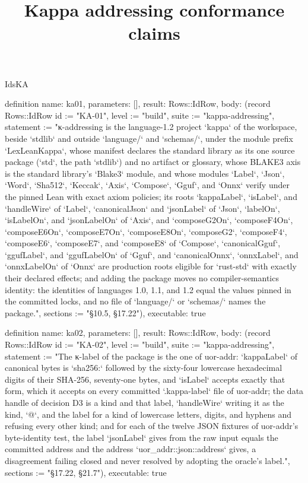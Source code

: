 \begin{lexlean}{IdsKA}
\title{Kappa addressing conformance claims}
\begin{semanticmodule}
definition{
  name: ka01,
  parameters: [],
  result: Rows::IdRow,
  body: (record Rows::IdRow {id := "KA-01", level := "build", suite := "kappa-addressing", statement := "κ-addressing is the language-1.2 project `kappa` of the workspace, beside `stdlib` and outside `language/` and `schemas/`, under the module prefix `LexLeanKappa`, whose manifest declares the standard library as its one source package (`std`, the path `stdlib`) and no artifact or glossary, whose BLAKE3 axis is the standard library's `Blake3` module, and whose modules `Label`, `Json`, `Word`, `Sha512`, `Keccak`, `Axis`, `Compose`, `Gguf`, and `Onnx` verify under the pinned Lean with exact axiom policies; its roots `kappaLabel`, `isLabel`, and `handleWire` of `Label`, `canonicalJson` and `jsonLabel` of `Json`, `labelOn`, `isLabelOn`, and `jsonLabelOn` of `Axis`, and `composeG2On`, `composeF4On`, `composeE6On`, `composeE7On`, `composeE8On`, `composeG2`, `composeF4`, `composeE6`, `composeE7`, and `composeE8` of `Compose`, `canonicalGguf`, `ggufLabel`, and `ggufLabelOn` of `Gguf`, and `canonicalOnnx`, `onnxLabel`, and `onnxLabelOn` of `Onnx` are production roots eligible for `rust-std` with exactly their declared effects; and adding the package moves no compiler-semantics identity: the identities of languages 1.0, 1.1, and 1.2 equal the values pinned in the committed locks, and no file of `language/` or `schemas/` names the package.", sections := "§10.5, §17.22"}),
  executable: true
}

definition{
  name: ka02,
  parameters: [],
  result: Rows::IdRow,
  body: (record Rows::IdRow {id := "KA-02", level := "build", suite := "kappa-addressing", statement := "The κ-label of the package is the one of uor-addr: `kappaLabel` of canonical bytes is `sha256:` followed by the sixty-four lowercase hexadecimal digits of their SHA-256, seventy-one bytes, and `isLabel` accepts exactly that form, which it accepts on every committed `.kappa-label` file of uor-addr; the data handle of decision D3 is a kind and that label, `handleWire` writing it as the kind, `@`, and the label for a kind of lowercase letters, digits, and hyphens and refusing every other kind; and for each of the twelve JSON fixtures of uor-addr's byte-identity test, the label `jsonLabel` gives from the raw input equals the committed address and the address `uor_addr::json::address` gives, a disagreement failing closed and never resolved by adopting the oracle's label.", sections := "§17.22, §21.7"}),
  executable: true
}


\end{semanticmodule}
\end{lexlean}
